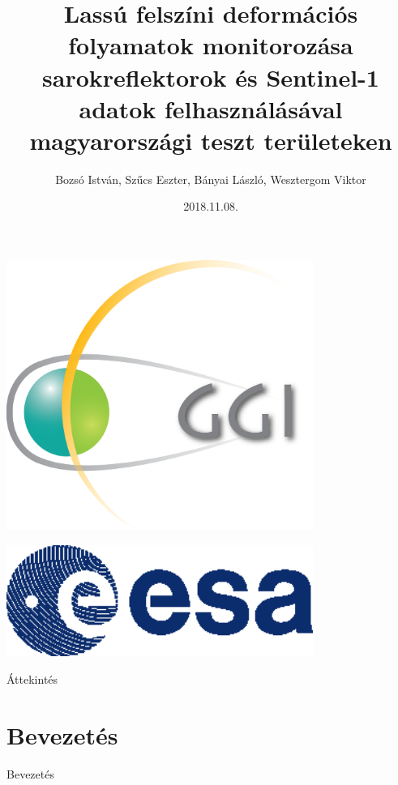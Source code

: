 \documentclass[aspectratio=169]{beamer}
\title[Geomatika Szeminárium 2018]{Lassú felszíni deformációs folyamatok monitorozása sarokreflektorok és Sentinel-1 adatok felhasználásával magyarországi teszt területeken}
\author[Bozsó et al.]{Bozsó István, Szűcs Eszter, Bányai László, Wesztergom Viktor}
\institute[MTA CSFK GGI]{MTA CSFK Geodéziai és Geofizikai Intézet}
\date{2018.11.08.}
\begin{document}
\begin{frame}
    \titlepage
    \begin{center}
        \begin{minipage}[c]{0.25\textwidth}
            \includegraphics[width=0.75\textwidth]{ggi_logo.png}
        \end{minipage}
        \hspace{30pt}
        \begin{minipage}[c]{0.25\textwidth}
            \includegraphics[width=0.75\textwidth]{esa_logo.eps}
        \end{minipage}
    \end{center}
\end{frame}

\begin{frame}{Áttekintés}
    \tableofcontents
\end{frame}

\section{Bevezetés}

\begin{frame}{Bevezetés}
    
\end{frame}
\end{document}
